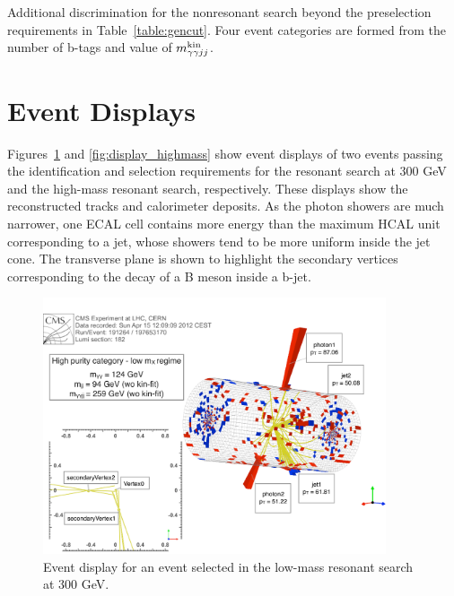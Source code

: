 \begin{table}[htbp!]
  \centering
  \renewcommand{\arraystretch}{1.4}
  \caption{Additional discrimination for the nonresonant search beyond the preselection requirements
in Table~\ref{table:gencut}. Four event categories are formed from the number of b-tags and value of
$m_{\gamma\gamma jj}^{\rm kin}$.}
  
  \label{table:nonres_addcuts}
\end{table}

\section{Event Displays\label{sec:displays}}

Figures~\ref{fig:display_lowmass} and \ref{fig:display_highmass} show event displays of two events
passing the identification and selection requirements for the resonant search at 300 GeV and the
high-mass resonant search, respectively. These displays show the reconstructed tracks and calorimeter
deposits. As the photon showers are much narrower, one ECAL cell contains more energy
than the maximum HCAL unit corresponding to a jet, whose showers tend to be more uniform inside
the jet cone. The transverse plane is shown to highlight the secondary vertices corresponding to
the decay of a B meson inside a b-jet.

\begin{figure}[htbp!]
 \begin{center}
   \includegraphics[width=0.9\textwidth]{figures/selection/display_evt300.pdf}
 \end{center}
\caption{Event display for an event selected in the low-mass resonant search at 300 GeV.}
\label{fig:display_lowmass}
\end{figure}

